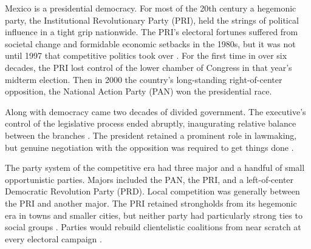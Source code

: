 \documentclass[letter,12pt]{article}
\begin{document}


Mexico is a presidential democracy. For most of the 20th century a hegemonic party, the Institutional Revolutionary Party (PRI), held the strings of political influence in a tight grip nationwide. The PRI's electoral fortunes suffered from societal change and formidable economic setbacks in the 1980s, but it was not until 1997 that competitive politics took over \citep{scott.1959,cosio.villegas.1981,molinar.1991a,cornelius.1996}. For the first time in over six decades, the PRI lost control of the lower chamber of Congress in that year's midterm election. Then in 2000 the country's long-standing right-of-center opposition, the National Action Party (PAN) won the presidential race.  

Along with democracy came two decades of divided government. The executive's control of the legislative process ended abruptly, inaugurating relative balance between the branches \citep{weldon.1997,lujambio.1996}. The president retained a prominent role in lawmaking, but genuine negotiation with the opposition was required to get things done \citep{casarSinMay2013,bejarQuienLegisla2012}. 

The party system of the competitive era had three major and a handful of small opportunistic parties. Majors included the PAN, the PRI, and a left-of-center Democratic Revolution Party (PRD). Local competition was generally between the PRI and another major. The PRI retained strongholds from its hegemonic era in towns and smaller cities, but neither party had particularly strong ties to social groups \citep{moreno.decisElec.2009}. Parties would rebuild clientelistic coalitions from near scratch at every electoral campaign \citep{diaz-estevez-magaloni-Poverty-book.2016}.
\end{document}
